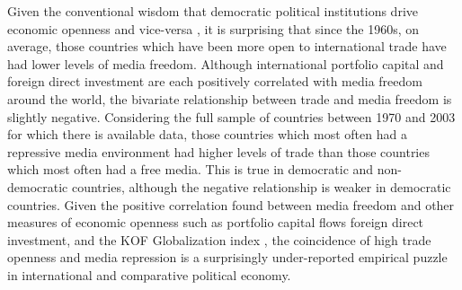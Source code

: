 \documentclass[12pt,a4paper]{article}\usepackage[]{graphicx}\usepackage[]{color}
\begin{document}
Given the conventional wisdom that democratic political institutions drive economic openness \parencite{Milner:2005ci} and vice-versa \parencite{EICHENGREEN:2008gg}, it is surprising that since the 1960s, on average, those countries which have been more open to international trade have had lower levels of media freedom. Although international portfolio capital and foreign direct investment are each positively correlated with media freedom around the world, the bivariate relationship between trade and media freedom is slightly negative. Considering the full sample of countries between 1970 and 2003 for which there is available data, those countries which most often had a repressive media environment had higher levels of trade than those countries which most often had a free media. This is true in democratic and non-democratic countries, although the negative relationship is weaker in democratic countries. Given the positive correlation found between media freedom and other measures of economic openness such as portfolio capital flows foreign direct investment, and the KOF Globalization index \parencite{Dreher:2008dg}, the coincidence of high trade openness and media repression is a surprisingly under-reported empirical puzzle in international and comparative political economy.
\end{document}
